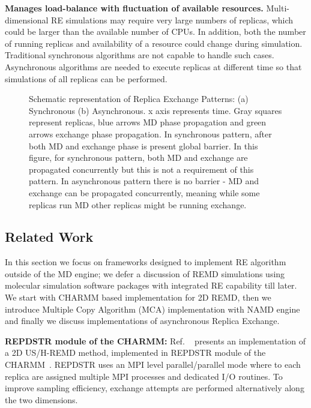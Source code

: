 \documentclass{sig-alternate-05-2015}
\begin{document}
\textbf{Manages load-balance with fluctuation of available resources.} Multi-dimensional RE
simulations may require very large numbers of replicas, which could be larger than the
available number of CPUs. In addition, both the number of running replicas and
availability of a resource could change during simulation. Traditional synchronous algorithms are
not capable to handle such cases. Asynchronous algorithms are needed to execute replicas at
different time so that simulations of all replicas can be performed.

\begin{figure}[ht!]
  \centering
  \hfill
  \caption{\small{Schematic representation of Replica Exchange Patterns: (a) Synchronous (b) Asynchronous. x axis represents time. Gray squares represent replicas, blue arrows MD phase propagation and green arrows exchange phase propagation. In synchronous pattern, after both MD and exchange phase is present global barrier. In this figure, for synchronous pattern, both MD and exchange are propagated concurrently but this is not a requirement of this pattern. In asynchronous pattern there is no barrier - MD and exchange can be propagated concurrently, meaning while some replicas run MD other replicas might be running exchange.}  }
  \label{fig:re_patterns}
\end{figure} 

\subsection{Related Work} \label{related.work}

In this section we focus on frameworks designed to implement RE algorithm outside of the MD engine; we defer a discussion of REMD simulations using molecular simulation software packages with integrated RE capability till later. We start with CHARMM based implementation for 2D REMD, then we introduce Multiple Copy Algorithm (MCA) implementation with NAMD engine and finally we discuss implementations of asynchronous Replica Exchange.

{\bf REPDSTR module of the CHARMM:} 
Ref. ~\cite{Jiang_JChemTheoryComput_2012_v8_p4672} presents an implementation of a 2D US/H-REMD method, implemented in REPDSTR module of the CHARMM~\cite{charmm}. REPDSTR uses an MPI level parallel/parallel mode where to each replica are assigned multiple MPI processes and dedicated I/O routines. To improve sampling efficiency, exchange attempts are performed alternatively along the two dimensions. 
\end{document}
